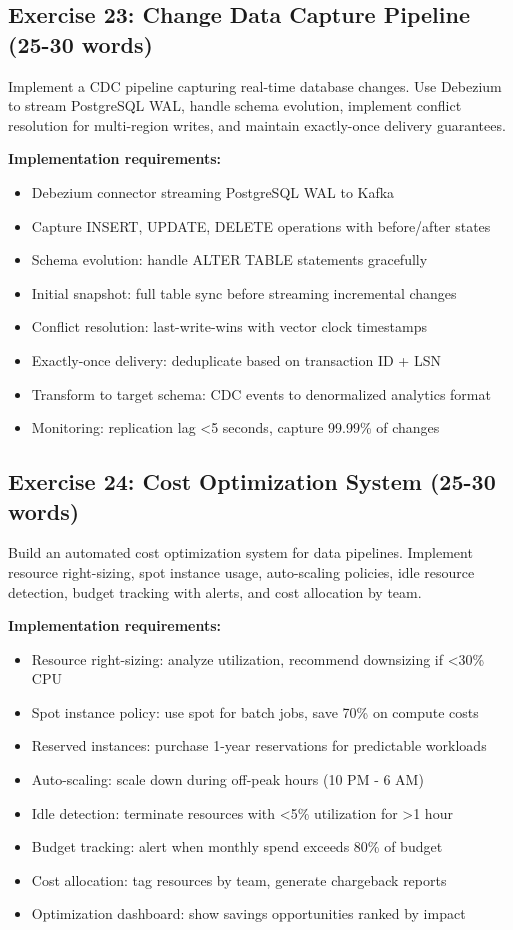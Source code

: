 \subsection{Exercise 23: Change Data Capture Pipeline (25-30 words)}

Implement a CDC pipeline capturing real-time database changes. Use Debezium to stream PostgreSQL WAL, handle schema evolution, implement conflict resolution for multi-region writes, and maintain exactly-once delivery guarantees.

\textbf{Implementation requirements:}
\begin{itemize}
    \item Debezium connector streaming PostgreSQL WAL to Kafka
    \item Capture INSERT, UPDATE, DELETE operations with before/after states
    \item Schema evolution: handle ALTER TABLE statements gracefully
    \item Initial snapshot: full table sync before streaming incremental changes
    \item Conflict resolution: last-write-wins with vector clock timestamps
    \item Exactly-once delivery: deduplicate based on transaction ID + LSN
    \item Transform to target schema: CDC events to denormalized analytics format
    \item Monitoring: replication lag <5 seconds, capture 99.99\% of changes
\end{itemize}

\subsection{Exercise 24: Cost Optimization System (25-30 words)}

Build an automated cost optimization system for data pipelines. Implement resource right-sizing, spot instance usage, auto-scaling policies, idle resource detection, budget tracking with alerts, and cost allocation by team.

\textbf{Implementation requirements:}
\begin{itemize}
    \item Resource right-sizing: analyze utilization, recommend downsizing if <30\% CPU
    \item Spot instance policy: use spot for batch jobs, save 70\% on compute costs
    \item Reserved instances: purchase 1-year reservations for predictable workloads
    \item Auto-scaling: scale down during off-peak hours (10 PM - 6 AM)
    \item Idle detection: terminate resources with <5\% utilization for >1 hour
    \item Budget tracking: alert when monthly spend exceeds 80\% of budget
    \item Cost allocation: tag resources by team, generate chargeback reports
    \item Optimization dashboard: show savings opportunities ranked by impact
\end{itemize}


